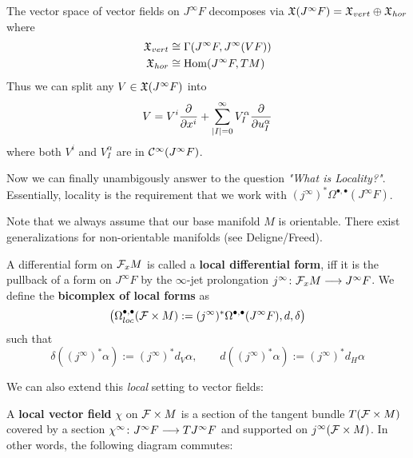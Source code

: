 \begin{corollary}
  The vector space of vector fields on $J^\infty F$ decomposes via $\mathfrak{X}(J^\infty F) = \mathfrak{X}_{vert} \oplus \mathfrak{X}_{hor}$ where
  \begin{align*}
    \mathfrak{X}_{vert} &\cong \Gamma(J^\infty F, J^\infty(VF))\\
    \mathfrak{X}_{hor} &\cong \operatorname{Hom}(J^\infty F, TM)
  \end{align*}
  Thus we can split any $V \in \mathfrak{X}(J^\infty F)$ into
  $$ V = V^i \frac{\partial }{\partial x^i} + \sum_{|I|=0}^\infty V^\alpha_I \frac{\partial }{\partial u^\alpha_I} $$
  where both $V^i$ and $V^\alpha_I$ are in $\mathcal{C}^{\infty}(J^\infty F)$.
\end{corollary}

Now we can finally unambigously answer to the question \emph{"What is Locality?"}. Essentially, locality is the requirement that we work with $(j^\infty)^* \Omega^{\bullet, \bullet}(J^\infty F)$.

\begin{rem}
  Note that we always assume that our base manifold $M$ is orientable. There exist generalizations for non-orientable manifolds (see Deligne/Freed).
\end{rem}

\begin{definition}
  A differential form on ${\mathcal{F}}_x M$ is called a \textbf{local differential form}, iff it is the pullback of a form on $J^\infty F$ by the $\infty$-jet prolongation $j^\infty\colon {\mathcal{F}}_x M \longrightarrow J^\infty F$. We define the \textbf{bicomplex of local forms} as
  $$ \left( \Omega^{\bullet, \bullet}_{loc} ({\mathcal{F}} \times M) := (j^\infty )^* \Omega^{\bullet, \bullet} (J^\infty F), d, \delta \right) $$
  such that
  $$ \delta((j^\infty)^* \alpha) := (j^\infty)^* d_V \alpha, \quad \quad d((j^\infty)^* \alpha) := (j^\infty)^* d_H \alpha $$
\end{definition}

We can also extend this \emph{local} setting to vector fields:

\begin{definition}
  A \textbf{local vector field} $\chi$ on ${\mathcal{F}} \times M$ is a section of the tangent bundle $T({\mathcal{F}}\times M)$ covered by a section $\chi^\infty\colon J^\infty F \longrightarrow TJ^\infty F$ and supported on $j^\infty({\mathcal{F}} \times M)$. In other words, the following diagram commutes:
  \begin{center}
  \end{center}
\end{definition}


